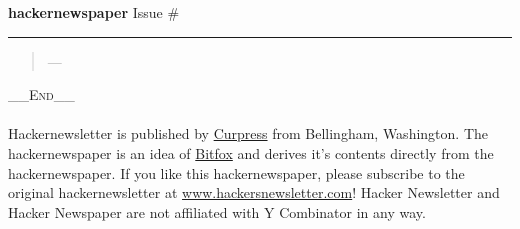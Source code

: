 \documentclass[10pt,a4paper]{article}
\begin{document}
\thispagestyle{empty}
\Huge {} 
\noindent\textbf{hacker{\color{red}news}paper}
\normalfont
\normalsize
\hfill Issue \#

{\noindent\color{red} \rule{\linewidth}{0.5mm}}

\begin{quotation}
    \textit{} \par\hfill ---  
\end{quotation}

\tableofcontents

\noindent\color{gray}
\huge \textsc{\_\_End\_\_ } \\ \\ 
\small Hackernewsletter is published by \href{www.curpress.com}{Curpress} from Bellingham, Washington. The hackernewspaper is an idea of \href{www.bitfox.nl}{Bitfox} and derives it's contents directly from the hackernewspaper. If you like this hackernewspaper, please subscribe to the original hackernewsletter at \href{www.hackersnewsletter.com}{www.hackersnewsletter.com}! Hacker Newsletter and Hacker Newspaper are not affiliated with Y Combinator in any way.

\color{black}


\newpage
\pagestyle{fancy}

\section{}



\subsection{}
\noindent\begin{minipage}[t]{0.19\linewidth}
\vspace{0pt}
\noindent\scshape\footnotesize
\\ {\scriptsize\fa{}}\space 
\href{\VAR{p.url}}{} 

\end{minipage} 
\begin{minipage}[t]{0.80\linewidth}
\vspace{0pt}
\begin{multicols}{2}
    \href{\VAR{n.url}}{
        \texttt{[image: \\VAR\{n.image]}}
    }
\paragraph{\VAR{n.firstline}}
\VAR{n.content}
\dots
\end{multicols}
\end{minipage}
\par\medskip
\end{document}
